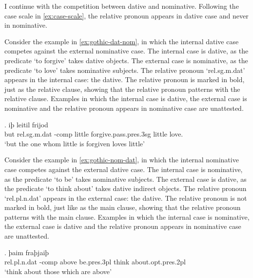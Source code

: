 I continue with the competition between dative and nominative. Following the case scale in \ref{ex:case-scale}, the relative pronoun appears in dative case and never in nominative.

Consider the example in \ref{ex:gothic-dat-nom}, in which the internal dative case competes against the external nominative case.
The internal case is dative, as the predicate  `to forgive' takes dative objects.
The external case is nominative, as the predicate  `to love' takes nominative subjects.
The relative pronoun  `\ac{rel}.\ac{sg}.\ac{m}.\ac{dat}' appears in the internal case: the dative. The relative pronoun is marked in bold, just as the relative clause, showing that the relative pronoun patterns with the relative clause.
Examples in which the internal case is dative, the external case is nominative and the relative pronoun appears in nominative case are unattested.

\exg. iþ     leitil frijod\\
 but \ac{rel}.\ac{sg}.\ac{m}.\ac{dat} -\ac{comp} little {forgive}.\ac{pass}.\ac{pres}.3\ac{sg}\scsub{[dat]} little love.\scsub{[nom]}\\
 `but the one whom little is forgiven loves little' \label{ex:gothic-dat-nom}

Consider the example in \ref{ex:gothic-nom-dat}, in which the internal nominative case competes against the external dative case.
The internal case is nominative, as the predicate  `to be' takes nominative subjects.
The external case is dative, as the predicate  `to think about' takes dative indirect objects.
The relative pronoun  `\ac{rel}.\ac{pl}.\ac{n}.\ac{dat}' appears in the external case: the dative. The relative pronoun is not marked in bold, just like as the main clause, showing that the relative pronoun patterns with the main clause.
Examples in which the internal case is nominative, the external case is dative and the relative pronoun appears in nominative case are unattested.

\exg. þaim    fraþjaiþ \\
 \ac{rel}.\ac{pl}.\ac{n}.\ac{dat} -\ac{comp} above be.\ac{pres}.3\ac{pl}\scsub{[nom]} {think about}.\ac{opt}.\ac{pres}.2\ac{pl}\scsub{[dat]}\\
 `think about those which are above' \label{ex:gothic-nom-dat}

